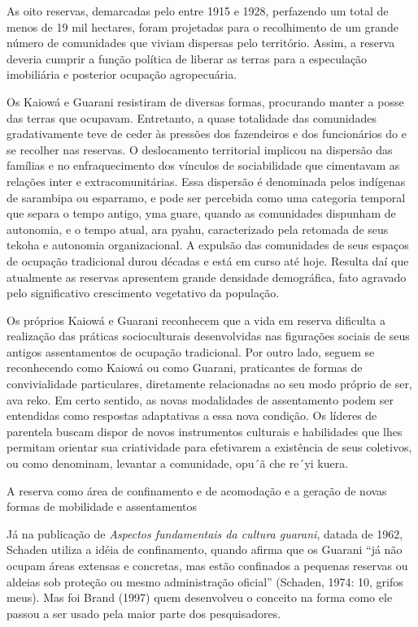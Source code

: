 {{As oito reservas, demarcadas pelo  entre 1915 e 1928, perfazendo um
total de menos de 19 mil hectares, foram projetadas para o recolhimento
de um grande número de comunidades que viviam dispersas pelo
território. Assim, a reserva deveria cumprir a função política de
liberar as terras para a especulação imobiliária e posterior ocupação
agropecuária. 

Os Kaiowá e Guarani resistiram de diversas formas, procurando manter a
posse das terras que ocupavam. Entretanto, a quase totalidade das
comunidades gradativamente teve de ceder às pressões dos fazendeiros e
dos funcionários do  e se recolher nas reservas. O deslocamento
territorial implicou na dispersão das famílias e no enfraquecimento dos
vínculos de sociabilidade que cimentavam as relações inter e
extracomunitárias. Essa dispersão é denominada pelos indígenas de
sarambipa ou esparramo, e pode ser percebida como uma categoria
temporal que separa o tempo antigo, yma guare, quando as comunidades
dispunham de autonomia, e o tempo atual, ara pyahu, caracterizado pela
retomada de seus tekoha e autonomia organizacional. A expulsão das
comunidades de seus espaços de ocupação tradicional durou décadas e
está em curso até hoje. Resulta daí que atualmente as reservas
apresentem grande densidade demográfica, fato agravado pelo
significativo crescimento vegetativo da população.

Os próprios Kaiowá e Guarani reconhecem que a vida em reserva dificulta
a realização das práticas socioculturais desenvolvidas nas figurações
sociais de seus antigos assentamentos de ocupação tradicional. Por
outro lado, seguem se reconhecendo como Kaiowá ou como Guarani,
praticantes de formas de convivialidade particulares, diretamente
relacionadas ao seu modo próprio de ser, ava reko. Em certo sentido, as
novas modalidades de assentamento podem ser entendidas como respostas
adaptativas a essa nova condição. Os líderes de parentela buscam dispor
de novos instrumentos culturais e habilidades que lhes permitam
orientar sua criatividade para efetivarem a existência de seus
coletivos, ou como denominam, levantar a comunidade, opu´ã che re´yi
kuera.

A reserva como área de confinamento e de acomodação e a geração de novas
formas de mobilidade e assentamentos

Já na publicação de \emph{Aspectos fundamentais da cultura guarani}, datada de
1962, Schaden utiliza a idéia de confinamento, quando afirma que os
Guarani ``já não ocupam áreas extensas e concretas, mas estão confinados
a pequenas reservas ou aldeias sob proteção ou mesmo administração
oficial'' (Schaden, 1974: 10, grifos meus). Mas foi Brand (1997) quem
desenvolveu o conceito na forma como ele passou a ser usado pela maior
parte dos pesquisadores.

}}
